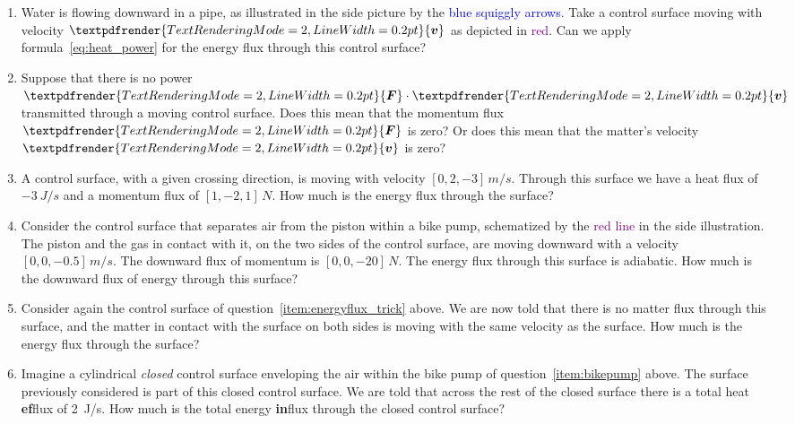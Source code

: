 \documentclass[a4paper,12pt,%
onecolumn,oneside,%
british%
]{memoir}
\renewcommand*{\bm}[1]{\textpdfrender{TextRenderingMode=2,LineWidth=0.2pt}{\boldsymbol{#1}}}
\renewcommand*{\|}[1][]{\nonscript\:#1\vert\nonscript\:\mathopen{}}
\newcommand*{\yv}{\bm{v}}
\newcommand*{\yF}{\bm{F}}
\begin{document}
\begin{exercise}
  \begin{enumerate}[exerc]
  \item Water is flowing downward in a pipe, as illustrated in the side picture by the \textcolor{blue}{blue squiggly arrows}. Take a control surface moving with velocity $\yv$ as depicted in \textcolor{purple}{red}. Can we apply  formula~\eqref{eq:heat_power} for the energy flux through this control surface?

  \item Suppose that there is no power $\yF\cdot\yv$ transmitted through a moving control surface. Does this mean that the momentum flux $\yF$ is zero? Or does this mean that the matter's velocity $\yv$ is zero?

  \item\label{item:energyflux_trick} A control surface, with a given crossing direction, is moving with velocity $[0,2,-3]\,\unit{m/s}$. Through this surface we have a heat flux of $\qty{-3}{J/s}$ and a momentum flux of $[1,-2,1]\,\unit{N}$. How much is the energy flux through the surface?

  \item\label{item:bikepump} Consider the control surface that separates air from the piston within a bike pump, schematized by the \textcolor{purple}{red line} in the side illustration. The piston and the gas in contact with it, on the two sides of the control surface, are moving downward with a velocity $[0,0,-0.5]\,\unit{m/s}$. The downward flux of momentum is $[0,0,-20]\,\unit{N}$. The energy flux through this surface is adiabatic. How much is the downward flux of energy through this surface?

  \item Consider again the control surface of question~\ref{item:energyflux_trick} above. We are now told that there is no matter flux through this surface, and the matter in contact with the surface on both sides is moving with the same velocity as the surface. How much is the energy flux through the surface?

  \item Imagine a cylindrical \emph{closed} control surface enveloping the air within the bike pump of question~\ref{item:bikepump} above. The surface previously considered is part of this closed control surface. We are told that across the rest of the closed surface there is a total heat \textbf{ef}flux of \qty{2}{J/s}. How much is the total energy \textbf{in}flux through the closed control surface?
  \end{enumerate}
\end{exercise}
\end{document}
